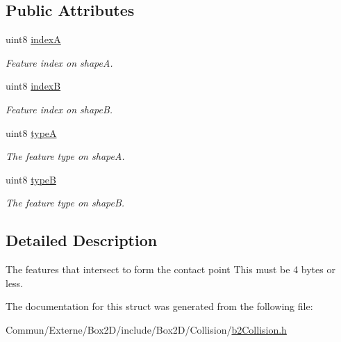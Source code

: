 \subsection*{Public Attributes}
\begin{DoxyCompactItemize}
\item 
uint8 \hyperlink{structb2_contact_feature_a833bc746e7cb5e3cd458f1c0809101d0}{indexA}\hypertarget{structb2_contact_feature_a833bc746e7cb5e3cd458f1c0809101d0}{}\label{structb2_contact_feature_a833bc746e7cb5e3cd458f1c0809101d0}

\begin{DoxyCompactList}\small\item\em Feature index on shapeA. \end{DoxyCompactList}\item 
uint8 \hyperlink{structb2_contact_feature_ad96712b6a0cc1f4b22b85b5948eab81d}{indexB}\hypertarget{structb2_contact_feature_ad96712b6a0cc1f4b22b85b5948eab81d}{}\label{structb2_contact_feature_ad96712b6a0cc1f4b22b85b5948eab81d}

\begin{DoxyCompactList}\small\item\em Feature index on shapeB. \end{DoxyCompactList}\item 
uint8 \hyperlink{structb2_contact_feature_a3361b651f0a88fb60ec6aba9f4921cc2}{typeA}\hypertarget{structb2_contact_feature_a3361b651f0a88fb60ec6aba9f4921cc2}{}\label{structb2_contact_feature_a3361b651f0a88fb60ec6aba9f4921cc2}

\begin{DoxyCompactList}\small\item\em The feature type on shapeA. \end{DoxyCompactList}\item 
uint8 \hyperlink{structb2_contact_feature_abb74afd6ee5b60834a3f8e2616182bdf}{typeB}\hypertarget{structb2_contact_feature_abb74afd6ee5b60834a3f8e2616182bdf}{}\label{structb2_contact_feature_abb74afd6ee5b60834a3f8e2616182bdf}

\begin{DoxyCompactList}\small\item\em The feature type on shapeB. \end{DoxyCompactList}\end{DoxyCompactItemize}


\subsection{Detailed Description}
The features that intersect to form the contact point This must be 4 bytes or less. 

The documentation for this struct was generated from the following file\+:\begin{DoxyCompactItemize}
\item 
Commun/\+Externe/\+Box2\+D/include/\+Box2\+D/\+Collision/\hyperlink{b2_collision_8h}{b2\+Collision.\+h}\end{DoxyCompactItemize}
